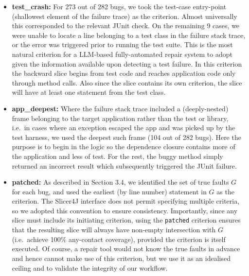 \documentclass[sigconf,nonacm]{acmart}
\begin{document}
\begin{itemize}
    \item \textbf{test\_crash:} For 273 out of 282 bugs, we took the test-case entry-point (shallowest element of the failure trace) as the criterion. Almost universally this corresponded to the relevant JUnit check. On the remaining 9 cases, we were unable to locate a line belonging to a test class in the failure stack trace, or the error was triggered prior to running the test suite. This is the most natural criterion for a LLM-based fully-automated repair system to adopt given the information available upon detecting a test failure. In this criterion the backward slice begins from test code and reaches application code only through method calls. Also since the slice contains its own criterion, the slice will have at least one statement from the test class.
    \item \textbf{app\_deepest:} Where the failure stack trace included a (deeply-nested) frame belonging to the target application rather than the test or library, i.e.\ in cases where an exception escaped the app and was picked up by the test harness, we used the deepest such frame (104 out of 282 bugs). Here the purpose is to begin in the logic so the dependence closure contains more of the application and less of test. For the rest, the buggy method simply returned an incorrect result which subsequently triggered the JUnit failure.
    \item \textbf{patched:} As described in Section 3.4, we identified the set of true faults $G$ for each bug, and used the earliest (by line number) statement in $G$ as the criterion. The Slicer4J interface does not permit specifying multiple criteria, so we adopted this convention to ensure consistency. Importantly, since any slice must include its initiating criterion, using the \texttt{patched} criterion ensures that the resulting slice will always have non-empty intersection with $G$ (i.e.\ achieve 100\% any-contact coverage), provided the criterion is itself executed. Of course, a repair tool would not know the true faults in advance and hence cannot make use of this criterion, but we use it as an idealised ceiling and to validate the integrity of our workflow.
\end{itemize}
\end{document}
